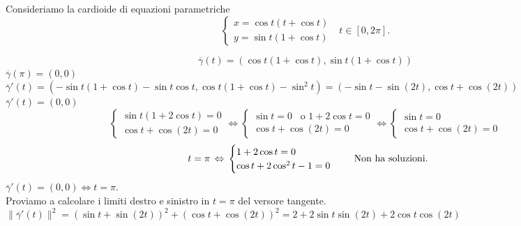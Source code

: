 \begin{exbar}
\begin{example}
	Consideriamo la cardioide di equazioni parametriche
	\begin{equation*}
		\begin{cases}
			x=\cos t(t+\cos t)\\
			y=\sin t(1+\cos t)
		\end{cases}\,\,\,\, t \in [0,2\pi].
	\end{equation*}
	
	\segnaposto %
	
	\begin{equation*}
		\overline{\gamma}(t)=(\cos t(1+\cos t),\sin t(1+\cos t))
	\end{equation*}
	$\overline{\gamma}(\pi)=(0,0)$\\
	$\overline{\gamma}'(t)=(-\sin t (1+\cos t)-\sin t\cos t, \cos t (1+\cos t)-\sin ^2t )=(-\sin t- \sin (2t),\cos t + \cos (2t))$\\
	$\overline{\gamma}'(t)=(0,0)$\\
	\begin{equation*}
		\begin{cases}
			\sin t (1+2 \cos t)=0\\
			\cos t + \cos (2t)=0
		\end{cases}\Leftrightarrow
		\begin{cases}
			\sin t =0\,\,\, \text{  o  }1+2\cos t =0\\
			\cos t + \cos (2t)=0
		\end{cases}\Leftrightarrow
		\begin{cases}
			\sin t =0\\
			\cos t + \cos (2t)=0
		\end{cases}
	\end{equation*}
	\begin{equation*}
		\,\,\, t=\pi\, \Leftrightarrow\\
		\begin{cases}
			1+2\cos t =0\\
			\cos t +2 \cos^2 t-1=0
		\end{cases}
		\,\,\,\,\,\,\, \text{Non ha soluzioni.}
	\end{equation*}
	$\overline{\gamma}'(t)=(0,0) \Leftrightarrow t=\pi$.\\
	Proviamo a calcolare i limiti destro e sinistro in $t=\pi$ del versore tangente.\\
	$\|\overline{\gamma}'(t)\|^2=(\sin t + \sin (2t))^2+(\cos t +\cos (2t))^2=2+2\sin t \sin (2t)+2\cos t \cos (2t)$\\

\end{example}
\end{exbar}
